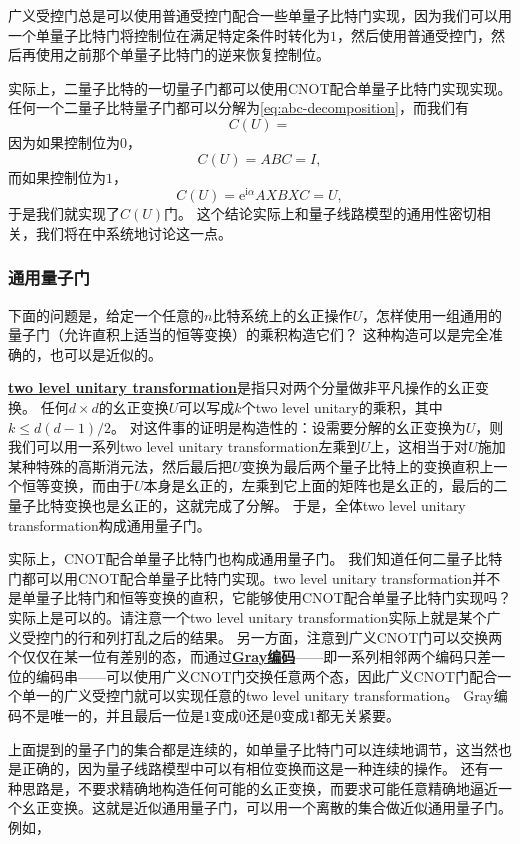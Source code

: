 \documentclass[hyperref, UTF8, a4paper]{ctexart}
\newcommand*{\ii}{\mathrm{i}}
\newcommand*{\ee}{\mathrm{e}}
\renewcommand{\autoref}{\prettyref}
\newcommand*{\concept}[1]{\underline{\textbf{#1}}}
\begin{document}
广义受控门总是可以使用普通受控门配合一些单量子比特门实现，因为我们可以用一个单量子比特门将控制位在满足特定条件时转化为$1$，然后使用普通受控门，然后再使用之前那个单量子比特门的逆来恢复控制位。

实际上，二量子比特的一切量子门都可以使用CNOT配合单量子比特门实现实现。
任何一个二量子比特量子门都可以分解为\eqref{eq:abc-decomposition}，而我们有
\begin{equation}
    C(U) = 
\end{equation}
因为如果控制位为$0$，
\[
    C(U) = ABC = I,
\]
而如果控制位为$1$，
\[
    C(U) = \ee^{\ii \alpha} A X B X C = U,
\]
于是我们就实现了$C(U)$门。
这个结论实际上和量子线路模型的通用性密切相关，我们将在\autoref{sec:universal}中系统地讨论这一点。

\subsubsection{通用量子门}\label{sec:universal}

下面的问题是，给定一个任意的$n$比特系统上的幺正操作$U$，怎样使用一组通用的量子门（允许直积上适当的恒等变换）的乘积构造它们？
这种构造可以是完全准确的，也可以是近似的。

\concept{two level unitary transformation}是指只对两个分量做非平凡操作的幺正变换。
任何$d \times d$的幺正变换$U$可以写成$k$个two level unitary的乘积，其中$k \leq d(d-1)/2$。
对这件事的证明是构造性的：设需要分解的幺正变换为$U$，则我们可以用一系列two level unitary transformation左乘到$U$上，这相当于对$U$施加某种特殊的高斯消元法，然后最后把$U$变换为最后两个量子比特上的变换直积上一个恒等变换，而由于$U$本身是幺正的，左乘到它上面的矩阵也是幺正的，最后的二量子比特变换也是幺正的，这就完成了分解。
于是，全体two level unitary transformation构成通用量子门。

实际上，CNOT配合单量子比特门也构成通用量子门。
我们知道任何二量子比特门都可以用CNOT配合单量子比特门实现。two level unitary transformation并不是单量子比特门和恒等变换的直积，它能够使用CNOT配合单量子比特门实现吗？
实际上是可以的。请注意一个two level unitary transformation实际上就是某个广义受控门的行和列打乱之后的结果。
另一方面，注意到广义CNOT门可以交换两个仅仅在某一位有差别的态，而通过\concept{Gray编码}——即一系列相邻两个编码只差一位的编码串——可以使用广义CNOT门交换任意两个态，因此广义CNOT门配合一个单一的广义受控门就可以实现任意的two level unitary transformation。
Gray编码不是唯一的，并且最后一位是$1$变成$0$还是$0$变成$1$都无关紧要。

上面提到的量子门的集合都是连续的，如单量子比特门可以连续地调节，这当然也是正确的，因为量子线路模型中可以有相位变换而这是一种连续的操作。
还有一种思路是，不要求精确地构造任何可能的幺正变换，而要求可能任意精确地逼近一个幺正变换。这就是近似通用量子门，可以用一个离散的集合做近似通用量子门。例如，
\end{document}
